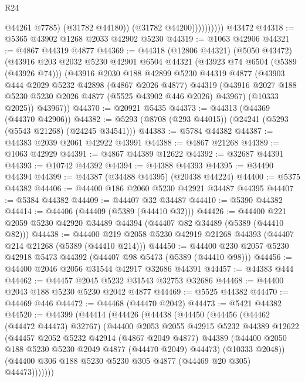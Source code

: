 \begin{lexlean}{R24}
\begin{coremodule}
                          @44261
                          @7785)
                        (@31782 @44180))
                      (@31782 @44200))))))))))
    @43472
@44318 := @5365 @43902 @1268 @2033 @42902 @5230
@44319 := @1063 @42906
@44321 := @4867 @44319 @4877
@44369 := @44318
    (@12806 @44321)
    (@5050 @43472)
    (@43916
      @203
      @2032
      @5230
      @42901
      @6504
      @44321
      (@43923 @74 @6504 (@5389 (@43926 @74)))
      (@43916
        @2030
        @188
        @42899
        @5230
        @44319
        @4877
        (@43903
          @444
          @2029
          @5232
          @42898
          (@4867 @2026 @4877)
          @44319
          (@43916 @2027 @188 @5230 @5230 @2026 @4877 (@5525 @43902 @446 @2026) @43967)
          (@10333 @2025))
        @43967))
@44370 := @20921 @5435
@44373 := @44313 (@44369 (@44370 @42906))
@44382 := @5293 (@8708 (@293 @44015)) (@24241 (@5293 (@5543 @21268) (@24245 @34541)))
@44383 := @5784 @44382
@44387 := @44383 @2039 @2061 @42922 @43991
@44388 := @4867 @21268
@44389 := @1063 @42929
@44391 := @4867 @44389 @12622
@44392 := @32687 @44391
@44393 := @10742 @44392
@44394 := @44388 @44393
@44395 := @34490 @44394
@44399 := @44387 (@34488 @44395) (@20438 @44224)
@44400 := @5375 @44382
@44406 := @44400 @186 @2060 @5230 @42921 @34487 @44395
@44407 := @5384 @44382
@44409 := @44407 @32 @34487
@44410 := @5390 @44382
@44414 := @44406 (@44409 (@5389 (@44410 @32)))
@44426 := @44400 @221 @2059 @5230 @42920 @34489 @44394 (@44407 @82 @34489 (@5389 (@44410 @82)))
@44438 := @44400 @219 @2058 @5230 @42919 @21268 @44393 (@44407 @214 @21268 (@5389 (@44410 @214)))
@44450 := @44400 @230 @2057 @5230 @42918 @5473 @44392 (@44407 @98 @5473 (@5389 (@44410 @98)))
@44456 := @44400 @2046 @2056 @31544 @42917 @32686 @44391
@44457 := @44383 @444
@44462 := @44457 @2045 @5232 @31543 @32753 @32686
@44468 := @44400 @2043 @188 @5230 @5230 @2042 @4877
@44469 := @5525 @44382
@44470 := @44469 @446
@44472 := @44468 (@44470 @2042)
@44473 := @5421 @44382
@44520 := @44399
    (@44414
      (@44426
        (@44438
          (@44450
            (@44456
              (@44462 (@44472 @44473) @32767)
              (@44400
                @2053
                @2055
                @42915
                @5232
                @44389
                @12622
                (@44457
                  @2052
                  @5232
                  @42914
                  (@4867 @2049 @4877)
                  @44389
                  (@44400 @2050 @188 @5230 @5230 @2049 @4877 (@44470 @2049) @44473)
                  (@10333 @2048))
                (@44400 @306 @188 @5230 @5230 @305 @4877 (@44469 @20 @305) @44473)))))))

\end{coremodule}
\end{lexlean}
